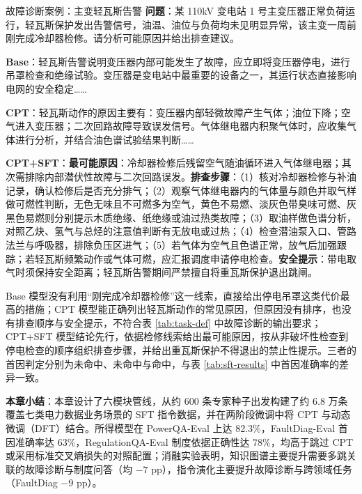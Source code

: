 \documentclass[fontset=fandol,type=master,campus=shenzhen,etitleauto=true]{hithesisbook}
\begin{document}
\begin{promptbox}{故障诊断案例：主变轻瓦斯告警}
\textbf{问题}：某 110kV 变电站 1 号主变压器正常负荷运行，轻瓦斯保护发出告警信号，油温、油位与负荷均未见明显异常，该主变一周前刚完成冷却器检修。请分析可能原因并给出排查建议。\par\smallskip
\textbf{Base}：轻瓦斯告警说明变压器内部可能发生了故障，应立即将变压器停电，进行吊罩检查和绝缘试验。变压器是变电站中最重要的设备之一，其运行状态直接影响电网的安全稳定……\par\smallskip
\textbf{CPT}：轻瓦斯动作的原因主要有：变压器内部轻微故障产生气体；油位下降；空气进入变压器；二次回路故障导致误发信号。气体继电器内积聚气体时，应收集气体进行分析，并结合油色谱试验结果判断……\par\smallskip
\textbf{CPT+SFT}：\textbf{最可能原因}：冷却器检修后残留空气随油循环进入气体继电器；其次需排除内部潜伏性故障与二次回路误发。\textbf{排查步骤}：（1）核对冷却器检修与补油记录，确认检修后是否充分排气；（2）观察气体继电器内的气体量与颜色并取气样做可燃性判断，无色无味且不可燃多为空气，黄色不易燃、淡灰色带臭味可燃、灰黑色易燃则分别提示木质绝缘、纸绝缘或油过热类故障；（3）取油样做色谱分析，对照乙炔、氢气与总烃的注意值判断有无放电或过热；（4）检查潜油泵入口、管路法兰与呼吸器，排除负压区进气；（5）若气体为空气且色谱正常，放气后加强跟踪；若轻瓦斯频繁动作或气体可燃，应汇报调度申请停电检查。\textbf{安全提示}：带电取气时须保持安全距离；轻瓦斯告警期间严禁擅自将重瓦斯保护退出跳闸。
\end{promptbox}

Base 模型没有利用“刚完成冷却器检修”这一线索，直接给出停电吊罩这类代价最高的措施；CPT 模型能正确列出轻瓦斯动作的常见原因，但原因没有排序，也没有排查顺序与安全提示，不符合表 \ref{tab:task-def} 中故障诊断的输出要求；CPT+SFT 模型结论先行，依据检修线索给出最可能原因，按从非破坏性检查到停电检查的顺序组织排查步骤，并给出重瓦斯保护不得退出的禁止性提示。三者的首因判定分别为未命中、未命中与命中，与表 \ref{tab:sft-results} 中首因准确率的差异一致。

\vspace{0.5cm}
\noindent \textbf{本章小结}：本章设计了六模块管线，从约 600 条专家种子出发构建了约 6.8 万条覆盖七类电力数据业务场景的 SFT 指令数据，并在两阶段微调中将 CPT 与动态微调（DFT）结合。所得模型在 PowerQA-Eval 上达 82.3\%，FaultDiag-Eval 首因准确率达 63\%，RegulationQA-Eval 制度依据正确性达 78\%，均高于跳过 CPT 或采用标准交叉熵损失的对照配置；消融实验表明，知识图谱主要提升需要多跳关联的故障诊断与制度问答（均 $-7$ pp），指令演化主要提升故障诊断与跨领域任务（FaultDiag $-9$ pp）。
\end{document}

